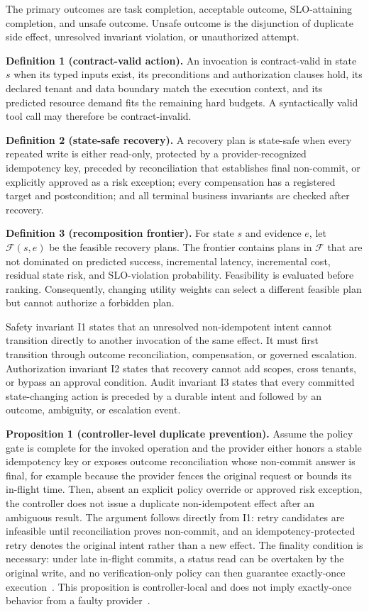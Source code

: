 \documentclass[10pt,journal,compsoc]{IEEEtran}
\begin{document}
The primary outcomes are task completion, acceptable outcome, SLO-attaining completion, and unsafe outcome. Unsafe outcome is the disjunction of duplicate side effect, unresolved invariant violation, or unauthorized attempt.

\textbf{Definition 1 (contract-valid action).} An invocation is contract-valid in state $s$ when its typed inputs exist, its preconditions and authorization clauses hold, its declared tenant and data boundary match the execution context, and its predicted resource demand fits the remaining hard budgets. A syntactically valid tool call may therefore be contract-invalid.

\textbf{Definition 2 (state-safe recovery).} A recovery plan is state-safe when every repeated write is either read-only, protected by a provider-recognized idempotency key, preceded by reconciliation that establishes final non-commit, or explicitly approved as a risk exception; every compensation has a registered target and postcondition; and all terminal business invariants are checked after recovery.

\textbf{Definition 3 (recomposition frontier).} For state $s$ and evidence $e$, let $\mathcal{F}(s,e)$ be the feasible recovery plans. The frontier contains plans in $\mathcal{F}$ that are not dominated on predicted success, incremental latency, incremental cost, residual state risk, and SLO-violation probability. Feasibility is evaluated before ranking. Consequently, changing utility weights can select a different feasible plan but cannot authorize a forbidden plan.

Safety invariant I1 states that an unresolved non-idempotent intent cannot transition directly to another invocation of the same effect. It must first transition through outcome reconciliation, compensation, or governed escalation. Authorization invariant I2 states that recovery cannot add scopes, cross tenants, or bypass an approval condition. Audit invariant I3 states that every committed state-changing action is preceded by a durable intent and followed by an outcome, ambiguity, or escalation event.

\textbf{Proposition 1 (controller-level duplicate prevention).} Assume the policy gate is complete for the invoked operation and the provider either honors a stable idempotency key or exposes outcome reconciliation whose non-commit answer is final, for example because the provider fences the original request or bounds its in-flight time. Then, absent an explicit policy override or approved risk exception, the controller does not issue a duplicate non-idempotent effect after an ambiguous result. The argument follows directly from I1: retry candidates are infeasible until reconciliation proves non-commit, and an idempotency-protected retry denotes the original intent rather than a new effect. The finality condition is necessary: under late in-flight commits, a status read can be overtaken by the original write, and no verification-only policy can then guarantee exactly-once execution~\cite{li2026exactlyonce}. This proposition is controller-local and does not imply exactly-once behavior from a faulty provider~\cite{helland2012idempotence}.
\end{document}
